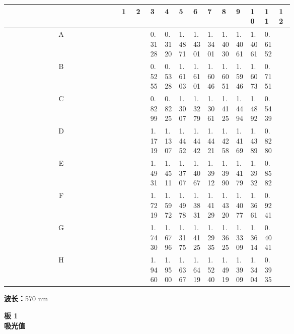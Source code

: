 \documentclass[UTF8,10pt,a4paper,fontset=fandol]{ctexart}
\begin{document}
\begin{center}
\scriptsize
\begin{tabular}{c|*{12}{p{0.055\linewidth}|}}
 & 1 & 2 & 3 & 4 & 5 & 6 & 7 & 8 & 9 & 10 & 11 & 12\\ \hline
A & & & 0.3128 & 0.3120 & 1.4871 & 1.4301 & 1.3401 & 1.4030 & 1.4061 & 1.4061 & 0.6152 & \\ \hline
B & & & 0.5255 & 0.5328 & 1.6103 & 1.6101 & 1.6046 & 1.6051 & 1.5946 & 1.6073 & 0.7151 & \\ \hline
C & & & 0.8299 & 0.8225 & 1.3007 & 1.3279 & 1.3061 & 1.4125 & 1.4494 & 1.4892 & 0.5439 & \\ \hline
D & & & 1.1719 & 1.1307 & 1.4452 & 1.4442 & 1.4421 & 1.4258 & 1.4169 & 1.4389 & 0.8280 & \\ \hline
E & & & 1.4931 & 1.4511 & 1.3707 & 1.4067 & 1.3912 & 1.3990 & 1.4179 & 1.3932 & 0.8582 & \\ \hline
F & & & 1.7219 & 1.5972 & 1.4978 & 1.3831 & 1.4129 & 1.4320 & 1.4077 & 1.3661 & 0.9241 & \\ \hline
G & & & 1.7430 & 1.6796 & 1.3175 & 1.4125 & 1.2935 & 1.3625 & 1.3309 & 1.3614 & 0.4041 & \\ \hline
H & & & 1.9460 & 1.9500 & 1.6367 & 1.6419 & 1.5240 & 1.4919 & 1.3909 & 1.3404 & 0.3935 & \\ \hline
\end{tabular}
\end{center}


\textbf{波长：}570 nm

\textbf{板 1}\\
\textbf{吸光值}
\end{document}
